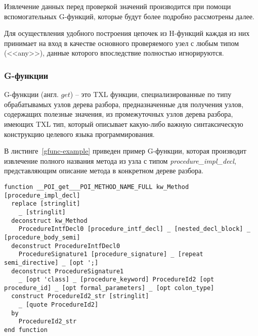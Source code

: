 Извлечение данных перед проверкой значений производится при помощи вспомогательных G-функций, которые будут более подробно рассмотрены далее.

Для осуществления удобного построения цепочек из H-функций каждая из них принимает на вход в качестве основного проверяемого узел с любым типом (<<any>>), данные которого впоследствие полностью игнорируются.

\subsubsection{G-функции}

G-функции (англ. $get$) -- это TXL функции, специализированные по типу обрабатывамых узлов дерева разбора, предназначенные для получения узлов, содержащих полезные значения, из промежуточных узлов дерева разбора, имеющих TXL тип, который описывает какую-либо важную синтаксическую конструкцию целевого языка программирования.

В листинге~\ref{gfunc-example} приведен пример G-функции, которая производит извлечение полного названия метода из узла с типом \textit{procedure\_impl\_decl}, представляющим описание метода в конкретном дереве разбора.

\begin{lstlisting}[frame=single, language=TXL, label={gfunc-example}, caption={Пример синтезированной G-функции.}]
function __POI_get___POI_METHOD_NAME_FULL kw_Method [procedure_impl_decl]
  replace [stringlit]
    _ [stringlit]
  deconstruct kw_Method
    ProcedureIntfDecl0 [procedure_intf_decl] _ [nested_decl_block] _ [procedure_body_semi]
  deconstruct ProcedureIntfDecl0
    ProcedureSignature1 [procedure_signature] _ [repeat semi_directive] _ [opt ';]
  deconstruct ProcedureSignature1
    _ [opt 'class] _ [procedure_keyword] ProcedureId2 [opt procedure_id] _ [opt formal_parameters] _ [opt colon_type]
  construct ProcedureId2_str [stringlit]
    _ [quote ProcedureId2]
  by
    ProcedureId2_str
end function
\end{lstlisting}

